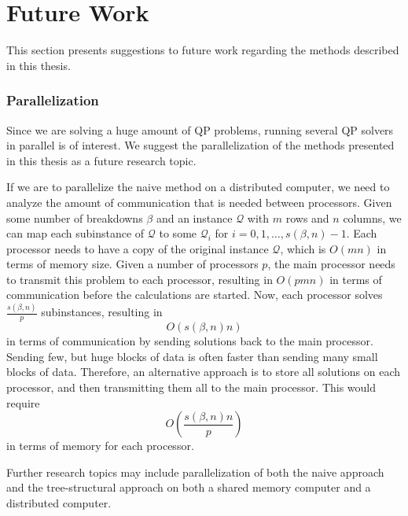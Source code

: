 \documentclass[a4paper,12pt]{report}
\begin{document}
\section{Future Work}
This section presents suggestions to future work regarding the methods
described in this thesis.

\subsubsection{Parallelization}
Since we are solving a huge amount of QP problems, running several QP solvers
in parallel is of interest. We suggest the parallelization of the methods
presented in this thesis as a future research topic.


If we are to parallelize the naive method on a distributed computer, we need to
analyze the amount of communication that is needed between processors.
Given some number of breakdowns $\beta$ and an instance $\mathcal{Q}$ with
$m$ rows and $n$ columns, we can map each subinstance of $\mathcal{Q}$ to some
$\mathcal{Q}_i$ for $i=0,1,\ldots,s(\beta,n) - 1$. Each processor needs to
have a copy of the original instance $\mathcal{Q}$, which is $O(mn)$ in terms
of memory size. Given a number of processors $p$, the main processor needs to
transmit this problem to each processor, resulting in $O(pmn)$ in terms of
communication before the calculations are started. Now, each
processor solves $\frac{s(\beta, n)}{p}$ subinstances, resulting in
\[
O(s(\beta, n)n)
\]
in terms of communication by sending solutions back to the main processor.
Sending few, but huge blocks of data is often faster than sending many small
blocks of data.
Therefore, an alternative approach is to store all solutions on each processor,
and then transmitting them all to the main processor.
This would require
\[
O\left(\frac{s(\beta, n)n}{p}\right)
\]
in terms of memory for each processor.

Further research topics may include parallelization of both the naive approach
and the tree-structural approach on both a shared memory computer and a
distributed computer.


{}


\onecolumn

\end{document}
